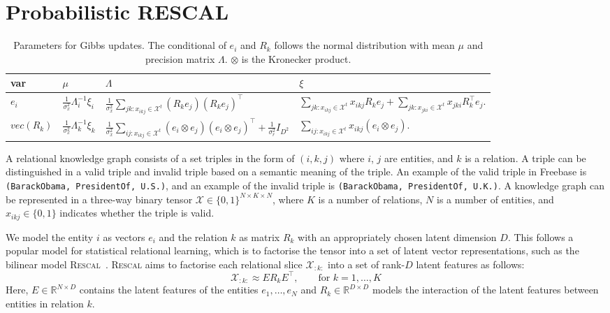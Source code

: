 \section{Probabilistic RESCAL}
\label{sec:brescal}

\begin{table*}[bt]
\caption{Parameters for Gibbs updates. The conditional of $e_i$ and $R_k$ follows the normal distribution with mean $\mu$ and precision matrix $\Lambda$. $\otimes$ is the Kronecker product.}
\label{tab:brescalposterior}
\begin{tabu}{l|l|l|l}
var&$\mu$&$\Lambda$&$\xi$\\
\hline
$e_i$&
$\frac{1}{\sigma_x^2}\Lambda_i^{-1}\xi_i$&
$\frac{1}{\sigma_x^2} \sum_{jk : x_{ikj} \in \mathcal{X}^{t}} (R_k e_j)(R_k e_j)^\top$&
$\sum_{jk : x_{ikj} \in \mathcal{X}^{t}}  x_{ikj} R_{k} e_{j} +
\sum_{jk : x_{jki} \in \mathcal{X}^{t}} x_{jki} R_{k}^\top e_{j}.$
\\
$vec(R_k)$&
$\frac{1}{\sigma_x^2}\Lambda_k^{-1}\xi_k$&
$\frac{1}{\sigma_x^2} \sum_{ij:x_{ikj} \in \mathcal{X}^{t}} (e_i
\otimes e_j)(e_i \otimes e_j)^\top + \frac{1}{\sigma_r^2} {I}_{D^2}$&
$\sum_{ij:x_{ikj} \in \mathcal{X}^{t}} x_{ikj} (e_{i} \otimes e_{j}).$
\end{tabu}
\end{table*}


A relational knowledge graph consists of a set triples in the form of $(i, k, j)$
where $i$, $j$ are entities, and $k$ is a relation. A triple can be distinguished
in a valid triple and invalid triple based on a semantic meaning of the triple. An
example of the valid triple in Freebase is \texttt{(BarackObama, PresidentOf, U.S.)}, and an
example of the invalid triple is \texttt{(BarackObama, PresidentOf, U.K.)}.
A knowledge graph can be represented in a three-way binary tensor
$\mathcal{X} \in \{0, 1\}^{N \times K \times N}$, where $K$ is a number of
relations, $N$ is a number of entities, and $x_{ikj}\in \{0, 1\}$ indicates whether
the triple is valid.

We model the entity $i$ as vectors $e_i$ and the relation $k$ as matrix $R_k$ with an
appropriately chosen latent dimension $D$. This follows a popular model
for statistical relational learning, which is to factorise the tensor into a
set of latent vector representations, such as the bilinear model \textsc{Rescal}~\cite{nickel2011three}.
\textsc{Rescal} aims to factorise each relational slice $\mathcal{X}_{:k:}$ into a set of rank-$D$ latent
features as follows:
\[
  \mathcal{X}_{:k:} \approx E R_k E^\top, \qquad \text{for } k = 1, \dots, K
\]
Here, $E\in {\mathbb R}^{N \times D}$ contains the latent features of the
entities $e_1, \ldots, e_N$ and $R_k\in {\mathbb R}^{D \times D}$ models the interaction of the
latent features between entities in relation $k$.

